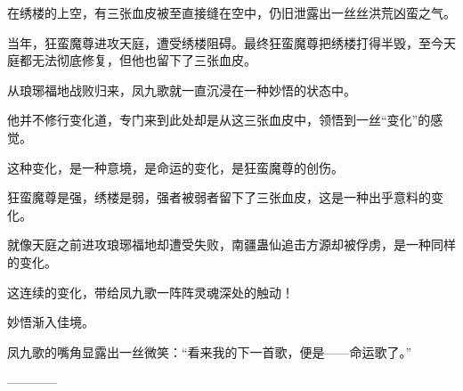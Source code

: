 \begin{this_body}
在绣楼的上空，有三张血皮被至直接缝在空中，仍旧泄露出一丝丝洪荒凶蛮之气。

当年，狂蛮魔尊进攻天庭，遭受绣楼阻碍。最终狂蛮魔尊把绣楼打得半毁，至今天庭都无法彻底修复，但他也留下了三张血皮。

从琅琊福地战败归来，凤九歌就一直沉浸在一种妙悟的状态中。

他并不修行变化道，专门来到此处却是从这三张血皮中，领悟到一丝“变化”的感觉。

这种变化，是一种意境，是命运的变化，是狂蛮魔尊的创伤。

狂蛮魔尊是强，绣楼是弱，强者被弱者留下了三张血皮，这是一种出乎意料的变化。

就像天庭之前进攻琅琊福地却遭受失败，南疆蛊仙追击方源却被俘虏，是一种同样的变化。

这连续的变化，带给凤九歌一阵阵灵魂深处的触动！

妙悟渐入佳境。

凤九歌的嘴角显露出一丝微笑：“看来我的下一首歌，便是——命运歌了。”

------------

\end{this_body}

